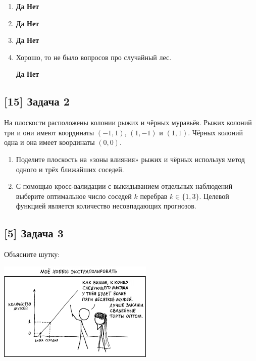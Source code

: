 \documentclass[12pt, a4paper, oneside]{article}
\begin{document}
\begin{enumerate}
	\item
	
	\hspace{2cm} \textbf{Да}  \hspace{4cm} \textbf{Нет} 
	 	
	\item
	
	\hspace{2cm} \textbf{Да}  \hspace{4cm} \textbf{Нет} 
	
	\item 
	
	\hspace{2cm} \textbf{Да}  \hspace{4cm} \textbf{Нет} 
	
	\item  	Хорошо, то не было вопросов про случайный лес.
	
	\hspace{2cm} \textbf{Да}  \hspace{4cm} \textbf{Нет} 
	
\end{enumerate}

\subsection*{[15] Задача 2}

На плоскости расположены колонии рыжих и чёрных муравьёв. Рыжих колоний три и они имеют координаты $(-1, 1)$, $(1, -1)$ и $(1, 1)$. Чёрных колоний одна и она имеет координаты $(0, 0)$.

\begin{enumerate}
	\item Поделите плоскость на «зоны влияния» рыжих и чёрных используя метод одного и трёх ближайших соседей.
	
	\item С помощью кросс-валидации с выкидыванием отдельных наблюдений выберите оптимальное число соседей $k$ перебрав $k \in \{1, 3 \}$. Целевой функцией является количество несовпадающих прогнозов.
\end{enumerate}


\subsection*{[5] Задача 3}

Объясните шутку: 

\begin{center}
	\includegraphics[scale=0.8]{memes.png}
\end{center}
\end{document}
